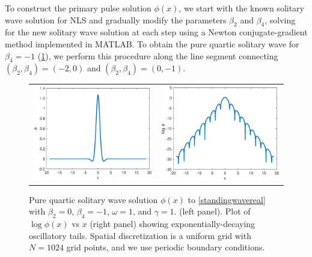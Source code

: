 \documentclass[12pt]{elsarticle}
\begin{document}
To construct the primary pulse solution $\phi(x)$, we start with the known solitary wave solution for NLS and gradually modify the parameters $\beta_2$ and $\beta_4$, solving for the new solitary wave solution at each step using a Newton conjugate-gradient method \cite[Chapter 7.2.4]{YangCh7} implemented in MATLAB. To obtain the pure quartic solitary wave for $\beta_4 = -1$ (\cref{fig:PQS}), we perform this procedure along the line segment connecting $(\beta_2, \beta_4) = (-2, 0)$ and $(\beta_2, \beta_4) = (0, -1)$.
\begin{figure}[H]
\centering
\begin{tabular}{cc}
\includegraphics[width=8cm]{images/PQS1.eps} &
\includegraphics[width=8cm]{images/PQS1log.eps}
\end{tabular}
\caption{Pure quartic solitary wave solution $\phi(x)$ to \cref{standingwavereal} with $\beta_2 = 0$, $\beta_4 = -1$, $\omega = 1$, and $\gamma = 1$. (left panel). Plot of $\log \phi(x)$ vs $x$ (right panel) showing exponentially-decaying oscillatory tails. Spatial discretization is a uniform grid with $N = 1024$ grid points, and we use periodic boundary conditions. }
\label{fig:PQS}
\end{figure} 
\end{document}
